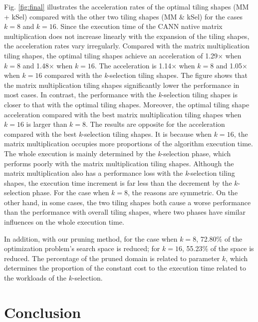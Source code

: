 \documentclass[12pt]{extbook}
\begin{document}
Fig. \ref{fig:final} illustrates the acceleration rates of the optimal tiling shapes (MM + kSel) compared with the other two tiling shapes (MM \& kSel) for the cases $k = 8$ and $k = 16$. Since the execution time of the CANN native matrix multiplication does not increase linearly with the expansion of the tiling shapes, the acceleration rates vary irregularly. Compared with the matrix multiplication tiling shapes, the optimal tiling shapes achieve an acceleration of 1.29$\times$ when $k = 8$ and 1.48$\times$ when $k = 16$. The acceleration is 1.14$\times$ when $k = 8$ and 1.05$\times$ when $k = 16$ compared with the \textit{k}-selection tiling shapes. The figure shows that the matrix multiplication tiling shapes significantly lower the performance in most cases. In contrast, the performance with the \textit{k}-selection tiling shapes is closer to that with the optimal tiling shapes. Moreover, the optimal tiling shape acceleration compared with the best matrix multiplication tiling shapes when $k = 16$ is larger than $k = 8$. The results are opposite for the acceleration compared with the best \textit{k}-selection tiling shapes. It is because when $k = 16$, the matrix multiplication occupies more proportions of the algorithm execution time. The whole execution is mainly determined by the \textit{k}-selection phase, which performs poorly with the matrix multiplication tiling shapes. Although the matrix multiplication also has a performance loss with the \textit{k}-selection tiling shapes, the execution time increment is far less than the decrement by the $k$-selection phase. For the case when $k = 8$, the reasons are symmetric. On the other hand, in some cases, the two tiling shapes both cause a worse performance than the performance with overall tiling shapes, where two phases have similar influences on the whole execution time.

In addition, with our pruning method, for the case when $k = 8$, 72.80\% of the optimization problem's search space is reduced; for $k = 16$, 55.23\% of the space is reduced. The percentage of the pruned domain is related to parameter $k$, which determines the proportion of the constant cost to the execution time related to the workloads of the $k$-selection.

\section{Conclusion}
\end{document}
